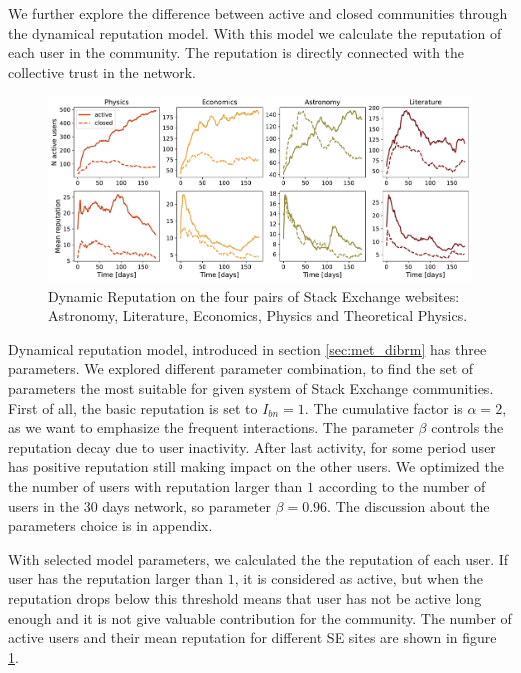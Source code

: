 We further explore the difference between active and closed communities through the dynamical reputation model. With this model we calculate the reputation of each user in the community. The reputation is directly connected with the collective trust in the network. 

\begin{figure}[h]
	\centering
	\includegraphics[width=\linewidth]{figures/stackexchange/reputation.pdf}
	\caption{Dynamic Reputation on the four pairs of Stack Exchange websites: Astronomy, Literature, Economics,  Physics and Theoretical Physics.}
	\label{fig:dr6panel}
\end{figure}



Dynamical reputation model, introduced in section \ref{sec:met_dibrm} has three parameters. We explored different parameter combination, to find the set of parameters the most suitable for given system of Stack Exchange communities. First of all, the basic reputation is set to $I_{bn}=1$. The cumulative factor is $\alpha=2$, as we want to emphasize the frequent interactions. The parameter $\beta$ controls the reputation decay due to user inactivity. After last activity, for some period user has positive reputation still making impact on the other users. We optimized the the number of users with reputation larger than $1$ according to the number of users in the 30 days network, so parameter $\beta=0.96$. The discussion about the parameters choice is in appendix. 

With selected model parameters, we calculated the the reputation of each user. If user has the reputation larger than $1$, it is considered as active, but when the reputation drops below this threshold means that user has not be active long enough and it is not give valuable contribution for the community. The number of active users and their mean reputation for different SE sites are shown in figure \ref{fig:dr6panel}. 


